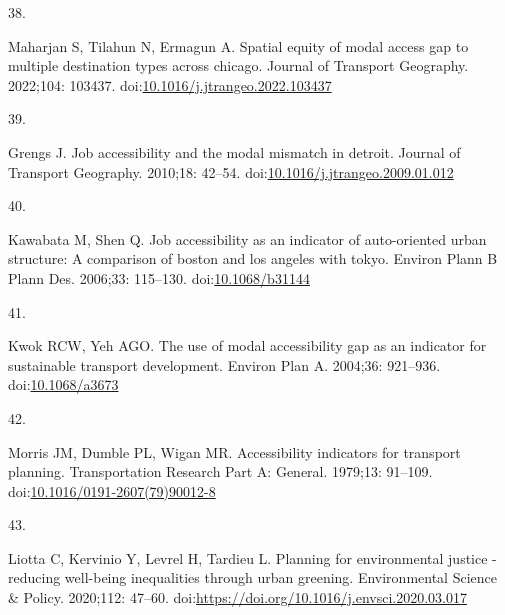 \documentclass[10pt,letterpaper]{article}
\newlength{\cslhangindent}
\newlength{\csllabelwidth}
\newlength{\cslentryspacingunit} %
\newenvironment{CSLReferences}[2] %
 {%
  \setlength{\parindent}{0pt}
  \ifodd #1
  \let\oldpar\par
  \def\par{\hangindent=\cslhangindent\oldpar}
  \fi
  \setlength{\parskip}{#2\cslentryspacingunit}
 }%
 {}
\newcommand{\CSLLeftMargin}[1]{\parbox[t]{\csllabelwidth}{#1}}
\newcommand{\CSLRightInline}[1]{\parbox[t]{\linewidth - \csllabelwidth}{#1}\break}
\providecommand{\DIFaddbegin}{} %
\providecommand{\DIFaddend}{} %
\providecommand{\DIFdelbegin}{} %
\providecommand{\DIFdelend}{} %
\newcommand{\DIFscaledelfig}{0.5}
\newlength{\DIFdelgraphicswidth} %
\newlength{\DIFdelgraphicsheight} %
\newcommand{\DIFaddincludegraphics}[2][]{{\color{blue}\fbox{\DIFOincludegraphics[#1]{#2}}}} %
\newcommand{\DIFdelincludegraphics}[2][]{%
\sbox{\DIFdelgraphicsbox}{\DIFOincludegraphics[#1]{#2}}%
\settoboxwidth{\DIFdelgraphicswidth}{\DIFdelgraphicsbox} %
\settoboxtotalheight{\DIFdelgraphicsheight}{\DIFdelgraphicsbox} %
\scalebox{\DIFscaledelfig}{%
\parbox[b]{\DIFdelgraphicswidth}{\usebox{\DIFdelgraphicsbox}\\[-\baselineskip] \rule{\DIFdelgraphicswidth}{0em}}\llap{\resizebox{\DIFdelgraphicswidth}{\DIFdelgraphicsheight}{%
\setlength{\unitlength}{\DIFdelgraphicswidth}%
\begin{picture}(1,1)%
\thicklines\linethickness{2pt} %
{\color[rgb]{1,0,0}\put(0,0){\framebox(1,1){}}}%
{\color[rgb]{1,0,0}\put(0,0){\line( 1,1){1}}}%
{\color[rgb]{1,0,0}\put(0,1){\line(1,-1){1}}}%
\end{picture}%
}\hspace*{3pt}}} %
} %
\DeclareRobustCommand{\DIFaddbegin}{\DIFOaddbegin \let\includegraphics\DIFaddincludegraphics} %
\DeclareRobustCommand{\DIFaddend}{\DIFOaddend \let\includegraphics\DIFOincludegraphics} %
\DeclareRobustCommand{\DIFdelbegin}{\DIFOdelbegin \let\includegraphics\DIFdelincludegraphics} %
\DeclareRobustCommand{\DIFdelend}{\DIFOaddend \let\includegraphics\DIFOincludegraphics} %
\begin{document}
\begin{CSLReferences}{0}{0}
\leavevmode{}%
\DIFdelbegin %
\DIFdelend \DIFaddbegin \CSLLeftMargin{38. }\DIFaddend %
\CSLRightInline{Maharjan S, Tilahun N, Ermagun A. Spatial equity of
modal access gap to multiple destination types across chicago. Journal
of Transport Geography. 2022;104: 103437.
doi:\href{https://doi.org/10.1016/j.jtrangeo.2022.103437}{10.1016/j.jtrangeo.2022.103437}}

\leavevmode{}%
\DIFdelbegin %
\DIFdelend \DIFaddbegin \CSLLeftMargin{39. }\DIFaddend %
\CSLRightInline{Grengs J. Job accessibility and the modal mismatch in
detroit. Journal of Transport Geography. 2010;18: 42--54.
doi:\href{https://doi.org/10.1016/j.jtrangeo.2009.01.012}{10.1016/j.jtrangeo.2009.01.012}}

\leavevmode{}%
\DIFdelbegin %
\DIFdelend \DIFaddbegin \CSLLeftMargin{40. }\DIFaddend %
\CSLRightInline{Kawabata M, Shen Q. Job accessibility as an indicator of
auto-oriented urban structure: A comparison of boston and los angeles
with tokyo. Environ Plann B Plann Des. 2006;33: 115--130.
doi:\href{https://doi.org/10.1068/b31144}{10.1068/b31144}}

\leavevmode{}%
\DIFdelbegin %
\DIFdelend \DIFaddbegin \CSLLeftMargin{41. }\DIFaddend %
\CSLRightInline{Kwok RCW, Yeh AGO. The use of modal accessibility gap as
an indicator for sustainable transport development. Environ Plan A.
2004;36: 921--936.
doi:\href{https://doi.org/10.1068/a3673}{10.1068/a3673}}

\leavevmode{}%
\DIFdelbegin %
\DIFdelend \DIFaddbegin \CSLLeftMargin{42. }\DIFaddend %
\CSLRightInline{Morris JM, Dumble PL, Wigan MR. Accessibility indicators
for transport planning. Transportation Research Part A: General.
1979;13: 91--109.
doi:\href{https://doi.org/10.1016/0191-2607(79)90012-8}{10.1016/0191-2607(79)90012-8}}

\leavevmode\vadjust pre{\DIFdelbegin %
\DIFdelend \DIFaddbegin \hypertarget{ref-liottaPlanning2020}{}\DIFaddend }%
\DIFdelbegin %
\DIFdelend \DIFaddbegin \CSLLeftMargin{43. }\DIFaddend %
\DIFdelbegin %
\DIFdelend \DIFaddbegin \CSLRightInline{Liotta C, Kervinio Y, Levrel H, Tardieu L. Planning for
environmental justice - reducing well-being inequalities through urban
greening. Environmental Science \& Policy. 2020;112: 47--60.
doi:\url{https://doi.org/10.1016/j.envsci.2020.03.017}}
\DIFaddend 


\end{CSLReferences}
\end{document}
